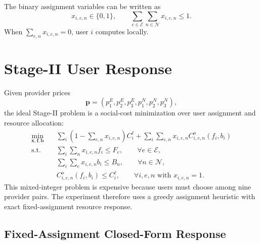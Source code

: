 \documentclass[11pt]{article}
\begin{document}
The binary assignment variables can be written as
\[
    x_{i,e,n}\in\{0,1\},\qquad
    \sum_{e\in\mathcal E}\sum_{n\in\mathcal N}x_{i,e,n}\le 1.
\]
When \(\sum_{e,n}x_{i,e,n}=0\), user \(i\) computes locally.

\section{Stage-II User Response}

Given provider prices
\[
    \boldsymbol p=(p^E_1,p^E_2,p^E_3,p^N_1,p^N_2,p^N_3),
\]
the ideal Stage-II problem is a social-cost minimization over user assignment
and resource allocation:
\begin{align}
    \min_{\boldsymbol x,\boldsymbol f,\boldsymbol b}\quad
    &
    \sum_i
    \left(1-\sum_{e,n}x_{i,e,n}\right)C_i^\ell
    +
    \sum_i\sum_{e,n}x_{i,e,n}C^o_{i,e,n}(f_i,b_i)
    \label{eq:multi-provider-scm}
    \\
    \text{s.t.}\quad
    &
    \sum_i\sum_n x_{i,e,n}f_i \le F_e,
    \qquad \forall e\in\mathcal E,
    \nonumber\\
    &
    \sum_i\sum_e x_{i,e,n}b_i \le B_n,
    \qquad \forall n\in\mathcal N,
    \nonumber\\
    &
    C^o_{i,e,n}(f_i,b_i)\le C_i^\ell,
    \qquad \forall i,e,n \text{ with }x_{i,e,n}=1.
    \nonumber
\end{align}
This mixed-integer problem is expensive because users must choose among nine
provider pairs.  The experiment therefore uses a greedy assignment heuristic
with exact fixed-assignment resource response.

\subsection{Fixed-Assignment Closed-Form Response}
\end{document}
